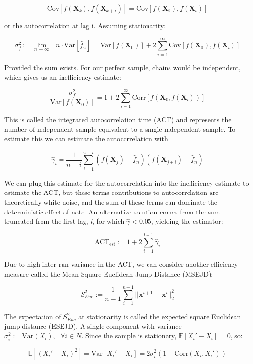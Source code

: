 \documentclass[a4paper]{article}
\begin{document}
\[\text{Cov} \left[f(\mathbf{X}_k), f(\mathbf{X}_{k+i}) \right] = \text{Cov} \left[f(\mathbf{X}_0), f (\mathbf{X}_i) \right] \]

or the autocorrelation at lag i. Assuming stationarity:

\[\sigma^2_f := \underset{n \rightarrow \infty}{\lim} \text{ } n \cdot  \text{Var} \left[\hat{f}_n \right] = \text{Var} \left[f(\mathbf{X}_0) \right] + 2 \sum^{\infty}_{i=1} \text{Cov} \left[f(\mathbf{X}_0), f(\mathbf{X}_i) \right] \]

Provided the sum exists. For our perfect sample, chains would be independent, which gives us an inefficiency estimate:

\[\frac{\sigma^2_f}{\text{Var} \left[f (\mathbf{X}_0) \right]} = 1 + 2 \sum^{\infty}_{i=1} \text{Corr} \left[f(\mathbf{X}_0, f(\mathbf{X}_i)) \right] \]

This is called the integrated autocorrelation time (ACT) and represents the number of independent sample equivalent to a single independent sample. To estimate this we can estimate the autocorrelation with:

\[\hat{\gamma}_i = \frac{1}{n-i} \sum^{n-i}_{j=1} \left(f(\mathbf{X}_j) - \hat{f}_n \right) \left(f(\mathbf{X}_{j+i}) - \hat{f}_n \right) \]

We can plug this estimate for the autocorrelation into the inefficiency estimate to estimate the ACT, but these terms contributions to autocorrelation are theoretically white noise, and the sum of these terms can dominate the deterministic effect of note. An alternative solution comes from the sum truncated from the first lag, \emph{l}, for which \(\hat{\gamma} < 0.05\), yielding the estimator:

\[\text{ACT}_{\text{est}} := 1 + 2 \sum^{l-1}_{i=1} \hat{\gamma}_i \]

Due to high inter-run variance in the ACT, we can consider another efficiency measure called the Mean Square Euclidean Jump Distance (MSEJD):

\[S^2_{E uc} := \frac{1}{n-1} \sum^{n-1}_{i=1} || \mathbf{x}^{i+1} - \mathbf{x}^i ||^2_2 \]

The expectation of \(S^2_{E uc}\) at stationarity is called the expected square Euclidean jump distance (ESEJD). A single component with variance \(\sigma^2_i := \text{Var} (X_i), \text{ } \forall i \in N\). Since the sample is stationary, \(\mathbb{E}[X_i ' - X_i ] = 0\), so:

\[\mathbb{E} \left[(X_i ' - X_i)^2 \right] = \text{Var} [X_i ' - X_i] = 2 \sigma^2_i (1 - \text{Corr}(X_i, X_i ')) \]
\end{document}
